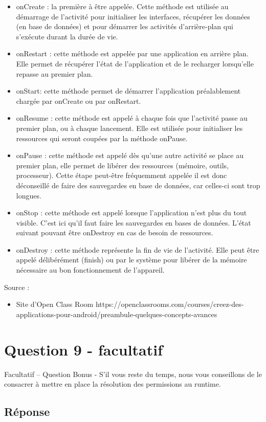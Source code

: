 \documentclass[francais,12pt]{article}
\begin{document}
		\begin{itemize}
			\item onCreate : la première à être appelée. Cette méthode est utilisée au démarrage de l'activité pour initialiser les interfaces, récupérer les données (en base de données) et pour démarrer les activités d'arrière-plan qui s'exécute durant la durée de vie.
			\item onRestart : cette méthode est appelée par une application en arrière plan. Elle permet de récupérer l'état de l'application et de le recharger lorsqu'elle repasse au premier plan.
			\item onStart: cette méthode permet de démarrer l'application préalablement chargée par onCreate ou par onRestart.
			\item onResume : cette méthode est appelé à chaque fois que l'activité passe au premier plan, ou à chaque lancement. Elle est utilisée pour initialiser les ressources qui seront coupées par la méthode onPause. 
			\item onPause : cette méthode est appelé dès qu'une autre activité se place au premier plan, elle permet de libérer des ressources (mémoire, outils, processeur). Cette étape peut-être fréquemment appelée il est donc déconseillé de faire des sauvegardes en base de données, car celles-ci sont trop longues.
			\item onStop : cette méthode est appelé lorsque l'application n'est plus du tout visible. C'est ici qu'il faut faire les sauvegardes en bases de données. L'état suivant pouvant être onDestroy en cas de besoin de ressources. 
			\item onDestroy : cette méthode représente la fin de vie de l'activité. Elle peut être appelé délibérément (finish) ou par le système pour libérer de la mémoire nécessaire au bon fonctionnement de l'appareil.		
		\end{itemize}
		
		Source :
		\begin{itemize}
			\item Site d'Open Class Room\newline
			https://openclassrooms.com/courses/creez-des-applications-pour-android/preambule-quelques-concepts-avances
		\end{itemize} 
		
		
	\section*{Question 9 - facultatif}
		Facultatif – Question Bonus - S’il vous reste du temps, nous vous conseillons de le consacrer à mettre en place la résolution des permissions au runtime. 
		
		\subsection*{Réponse}
	
\end{document}
